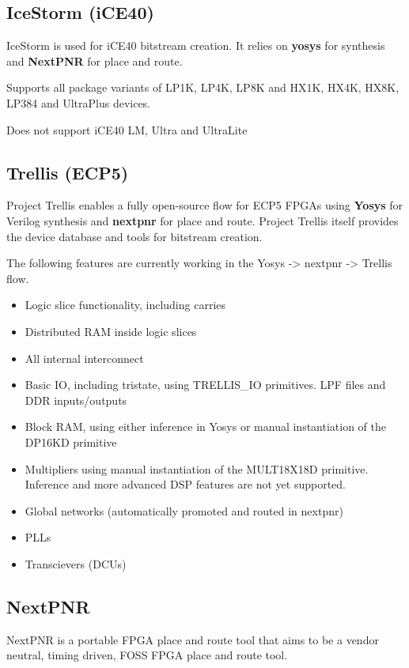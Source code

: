 
\subsection{IceStorm (iCE40)}
IceStorm is used for iCE40 bitstream creation. It relies on \textbf{yosys} for synthesis and \textbf{NextPNR} for place and route.

Supports all package variants of LP1K, LP4K, LP8K and HX1K, HX4K, HX8K, LP384 and UltraPlus devices.

Does not support iCE40 LM, Ultra and UltraLite
\subsection{Trellis (ECP5)}
Project Trellis enables a fully open-source flow for ECP5 FPGAs using \textbf{Yosys} for Verilog synthesis and \textbf{nextpnr} for place and route. Project Trellis itself provides the device database and tools for bitstream creation.

The following features are currently working in the Yosys -> nextpnr -> Trellis flow.

\begin{itemize}
\item Logic slice functionality, including carries
\item Distributed RAM inside logic slices
\item All internal interconnect
\item Basic IO, including tristate, using TRELLIS\_IO primitives. LPF files and DDR inputs/outputs
\item Block RAM, using either inference in Yosys or manual instantiation of the DP16KD primitive
\item Multipliers using manual instantiation of the MULT18X18D primitive. 
\newline Inference and more advanced DSP features are not yet supported.
\item Global networks (automatically promoted and routed in nextpnr)
\item PLLs
\item Transcievers (DCUs)
\end{itemize}

\subsection{NextPNR} 
    
NextPNR is a portable FPGA place and route tool that aims to be a vendor neutral, timing driven, FOSS FPGA place and route tool.

